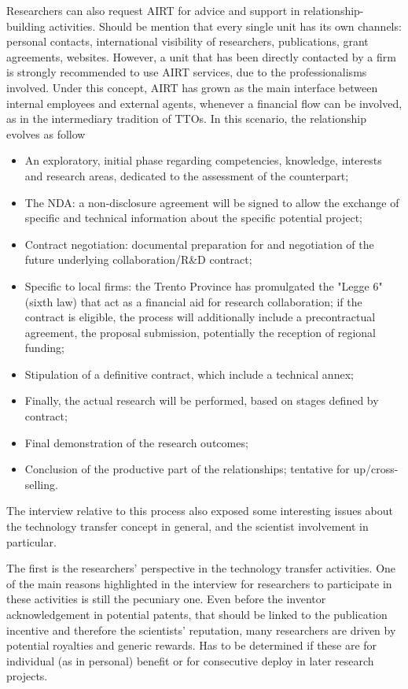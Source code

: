 Researchers can also request AIRT for advice and support in relationship-building activities. Should be mention that every single unit has its own channels: personal contacts, international visibility of researchers, publications, grant agreements, websites. However, a unit that has been directly contacted by a firm is strongly recommended to use AIRT services, due to the professionalisms involved. Under this concept, AIRT has grown as the main interface between internal employees and external agents, whenever a financial flow can be involved, as in the intermediary tradition of TTOs.
In this scenario, the relationship evolves as follow

\begin{itemize}

\item An exploratory, initial phase regarding competencies, knowledge, interests and research areas, dedicated to the assessment of the counterpart;
\item The NDA: a non-disclosure agreement will be signed to allow the exchange of specific and technical information about the specific potential project;
\item Contract negotiation: documental preparation for and negotiation of the future underlying collaboration/R\&D contract;
\item Specific to local firms: the Trento Province has promulgated the "Legge 6" (sixth law) that act as a financial aid for research collaboration; if the contract is eligible, the process will additionally include a precontractual agreement, the proposal submission, potentially the reception of regional funding;
\item Stipulation of a definitive contract, which include a technical annex;
\item Finally, the actual research will be performed, based on stages defined by contract;
\item Final demonstration of the research outcomes;
\item Conclusion of the productive part of the relationships; tentative for up/cross-selling.

\end{itemize}

The interview relative to this process also exposed some interesting issues about the technology transfer concept in general, and the scientist involvement in particular.

The first is the researchers’ perspective in the technology transfer activities. One of the main reasons highlighted in the interview for researchers to participate in these activities is still the pecuniary one. Even before the inventor acknowledgement in potential patents, that should be linked to the publication incentive and therefore the scientists’ reputation, many researchers are driven by potential royalties and generic rewards. Has to be determined if these are for individual (as in personal) benefit or for consecutive deploy in later research projects. 

